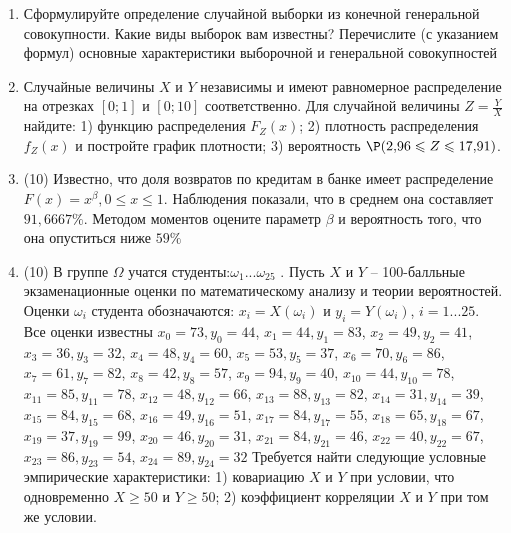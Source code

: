 \documentclass[a4paper,12pt]{article}
\begin{document}
\begin{enumerate}


\item


Сформулируйте определение случайной выборки из конечной генеральной совокупности. Какие
виды выборок вам известны? Перечислите (с указанием формул) основные характеристики выборочной и генеральной совокупностей


\item



Случайные величины $X$ и $Y$ независимы и имеют равномерное
распределение на отрезках $[0;1]$ и $[0;10]$ соответственно. Для случайной величины $Z=\frac{Y}{X}$ найдите: 
1) функцию распределения $F_Z(x)$;
2) плотность распределения $f_Z(x)$ и постройте график плотности;
3) вероятность $\P(2,\!96\leqslant Z\leqslant 17,\!91)$.


\item

(10) Известно, что доля возвратов по кредитам в банке имеет распределение $F(x) = x ^{\beta}, 0 \leqslant x \leqslant 1$.
Наблюдения показали, что в среднем она составляет $91,6667\%$. Методом моментов оцените параметр $\beta$ и
вероятность того, что она опуститься ниже $59\%$


\item


(10) В группе $\Omega$ учатся студенты:$\omega _{1}...\omega _{25}$ . Пусть $X$ и $Y$ – 100-балльные экзаменационные оценки по
математическому анализу и теории вероятностей. Оценки $\omega _{i}$ студента обозначаются: $x _{i} = X(\omega _{i})$ и $y _{i} = Y(\omega _{i})$, $i = 1...25$. Все оценки известны
$x _{0} = 73, y _{0} = 44$, $x _{1} = 44, y _{1} = 83$, $x _{2} = 49, y _{2} = 41$, $x _{3} = 36, y _{3} = 32$, $x _{4} = 48, y _{4} = 60$, $x _{5} = 53, y _{5} = 37$, $x _{6} = 70, y _{6} = 86$, $x _{7} = 61, y _{7} = 82$, $x _{8} = 42, y _{8} = 57$, $x _{9} = 94, y _{9} = 40$, $x _{10} = 44, y _{10} = 78$, $x _{11} = 85, y _{11} = 78$, $x _{12} = 48, y _{12} = 66$, $x _{13} = 88, y _{13} = 82$, $x _{14} = 31, y _{14} = 39$, $x _{15} = 84, y _{15} = 68$, $x _{16} = 49, y _{16} = 51$, $x _{17} = 84, y _{17} = 55$, $x _{18} = 65, y _{18} = 67$, $x _{19} = 37, y _{19} = 99$, $x _{20} = 46, y _{20} = 31$, $x _{21} = 84, y _{21} = 46$, $x _{22} = 40, y _{22} = 67$, $x _{23} = 86, y _{23} = 54$, $x _{24} = 89, y _{24} = 32$
Требуется
найти следующие условные эмпирические характеристики: 1) ковариацию $X$ и $Y$ при условии, что одновременно $X \geqslant 50$
 и $Y \geqslant 50$; 2) коэффициент корреляции $X$ и $Y$ при том же условии.



\end{enumerate}
\end{document}
